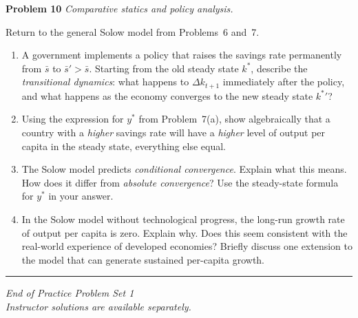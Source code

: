 \documentclass[12pt]{article}
\begin{document}


\noindent\textbf{Problem 10} \quad \textit{Comparative statics and policy analysis.}

\medskip
Return to the general Solow model from Problems~6 and~7.

\begin{enumerate}[label=(\alph*),leftmargin=2em,itemsep=4pt]
  \item A government implements a policy that raises the savings rate
        permanently from $\bar{s}$ to $\bar{s}' > \bar{s}$.
        Starting from the old steady state $k^*$, describe the
        \emph{transitional dynamics}: what happens to $\Delta k_{t+1}$
        immediately after the policy, and what happens as the economy
        converges to the new steady state ${k^*}'$?

  \item Using the expression for $y^*$ from Problem~7(a), show
        algebraically that a country with a \emph{higher} savings rate
        will have a \emph{higher} level of output per capita in the
        steady state, everything else equal.

  \item The Solow model predicts \emph{conditional convergence}.
        Explain what this means.  How does it differ from
        \emph{absolute convergence}?  Use the steady-state formula
        for $y^*$ in your answer.

  \item In the Solow model without technological progress, the
        long-run growth rate of output per capita is zero.
        Explain why.  Does this seem consistent with the real-world
        experience of developed economies?  Briefly discuss one
        extension to the model that can generate sustained per-capita
        growth.
\end{enumerate}

\bigskip\hrule\bigskip

\begin{center}
  \textit{End of Practice Problem Set 1}\\[4pt]
  \textit{Instructor solutions are available separately.}
\end{center}
\end{document}
